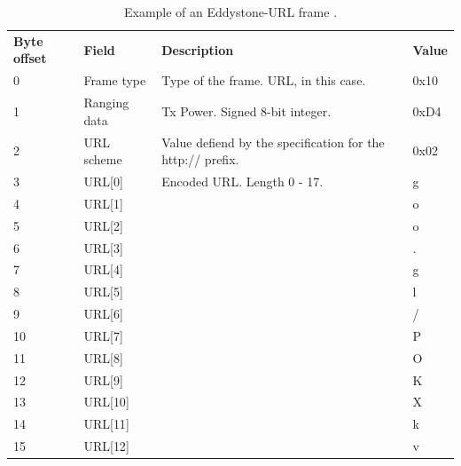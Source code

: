 \begin{table}[h!]
\centering
\caption{Example of an Eddystone-URL frame \cite{eddystone:protocol-url-spec}.}
\label{tbl:design:ble-positioning:eddystone-url}
\begin{tabular}{llll}
\textbf{Byte offset} & \textbf{Field} & \textbf{Description}                                       & \textbf{Value} \\
0                    & Frame type     & Type of the frame. URL, in this case.                      & 0x10           \\
1                    & Ranging data   & Tx Power. Signed 8-bit integer.                            & 0xD4           \\
2                    & URL scheme     & Value defiend by the specification for the http:// prefix. & 0x02           \\
3                    & URL{[}0{]}     & Encoded URL. Length 0 - 17.                                & g              \\
4                    & URL{[}1{]}     &                                                            & o              \\
5                    & URL{[}2{]}     &                                                            & o              \\
6                    & URL{[}3{]}     &                                                            & .              \\
7                    & URL{[}4{]}     &                                                            & g              \\
8                    & URL{[}5{]}     &                                                            & l              \\
9                    & URL{[}6{]}     &                                                            & /              \\
10                   & URL{[}7{]}     &                                                            & P              \\
11                   & URL{[}8{]}     &                                                            & O              \\
12                   & URL{[}9{]}     &                                                            & K              \\
13                   & URL{[}10{]}     &                                                            & X              \\
14                   & URL{[}11{]}     &                                                            & k              \\
15                   & URL{[}12{]}     &                                                            & v             
\end{tabular}
\end{table}


